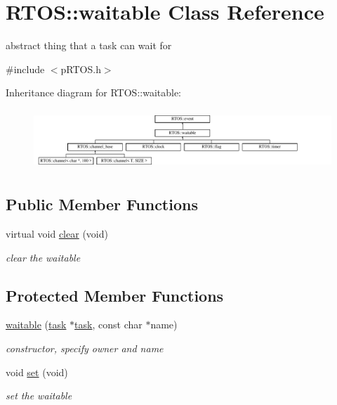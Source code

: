 \hypertarget{class_r_t_o_s_1_1waitable}{}\section{R\+T\+OS\+:\+:waitable Class Reference}
\label{class_r_t_o_s_1_1waitable}


abstract thing that a task can wait for  




{\ttfamily \#include $<$p\+R\+T\+O\+S.\+h$>$}

Inheritance diagram for R\+T\+OS\+:\+:waitable\+:\begin{figure}[H]
\begin{center}
\leavevmode
\includegraphics[height=2.285714cm]{class_r_t_o_s_1_1waitable}
\end{center}
\end{figure}
\subsection*{Public Member Functions}
\begin{DoxyCompactItemize}
\item 
virtual void \hyperlink{class_r_t_o_s_1_1waitable_a44ac71980592721bc03e076acc7e8c67}{clear} (void)
\begin{DoxyCompactList}\small\item\em clear the waitable \end{DoxyCompactList}\end{DoxyCompactItemize}
\subsection*{Protected Member Functions}
\begin{DoxyCompactItemize}
\item 
\hyperlink{class_r_t_o_s_1_1waitable_a5a5bf9012a332a6451ee10728153908a}{waitable} (\hyperlink{class_r_t_o_s_1_1task}{task} $\ast$\hyperlink{class_r_t_o_s_1_1task}{task}, const char $\ast$name)
\begin{DoxyCompactList}\small\item\em constructor, specify owner and name \end{DoxyCompactList}\item 
void \hyperlink{class_r_t_o_s_1_1waitable_a3a72bdf94092471e82ba2d04cdc4a58e}{set} (void)\hypertarget{class_r_t_o_s_1_1waitable_a3a72bdf94092471e82ba2d04cdc4a58e}{}\label{class_r_t_o_s_1_1waitable_a3a72bdf94092471e82ba2d04cdc4a58e}

\begin{DoxyCompactList}\small\item\em set the waitable \end{DoxyCompactList}\end{DoxyCompactItemize}
